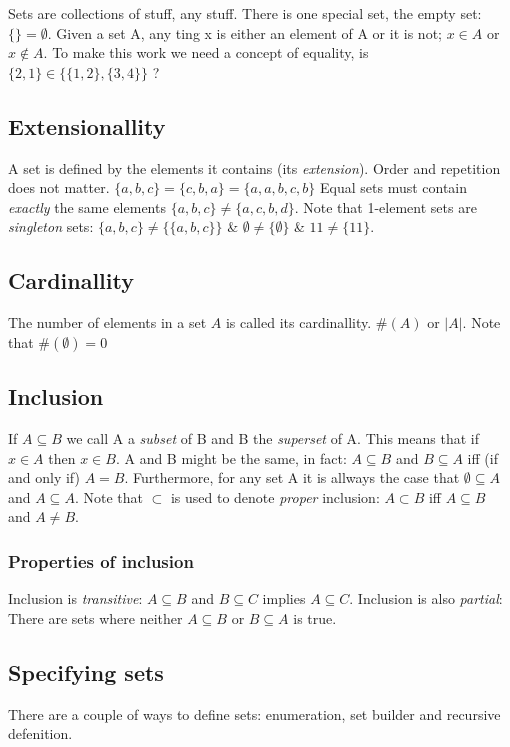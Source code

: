 \documentclass[12pt]{article} %
\begin{document}
Sets are collections of stuff, any stuff. There is one special set, the empty set: $\{\} = \emptyset$. Given a set A, any ting x is either an element of A or it is not; $x \in A$ or $x \notin A$. To make this work we need a concept of equality, is $\{2,1\} \in \{\{1,2\},\{3,4\}\}$ ? 

\subsection{Extensionallity}
A set is defined by the elements it contains (its \textit{extension}). Order and repetition does not matter. $\{a,b,c\} = \{c,b,a\} = \{a,a,b,c,b\}$ Equal sets must contain \textit{exactly} the same elements $\{a,b,c\} \neq \{a,c,b,d\}$. Note that 1-element sets are \textit{singleton} sets: $\{a,b,c\} \neq \{\{a,b,c\}\}$ \& $\emptyset \neq \{\emptyset\}$ \& $11 \neq \{11\}$.

\subsection{Cardinallity}

The number of elements in a set $A$ is called its cardinallity. $\#(A)$ or $|A|$. Note that $\#(\emptyset) = 0$

\subsection{Inclusion}
If $A \subseteq B$ we call A a \textit{subset} of B and B the \textit{superset} of A. This means that if $x \in A$ then $x \in B$. A and B might be the same, in fact: $A \subseteq B$ and $B \subseteq A$ iff (if and only if) $A = B$. Furthermore, for any set A it is allways the case that $\emptyset \subseteq A$ and $A \subseteq A$. Note that $\subset$ is used to denote \textit{proper} inclusion: $A \subset B$ iff $A \subseteq B$ and $A \neq B$.

\subsubsection{Properties of inclusion}
Inclusion is \textit{transitive}: $A \subseteq B$ and $B \subseteq C$ implies $A \subseteq C$. Inclusion is also \textit{partial}: There are sets where neither $A \subseteq B$ or $B \subseteq A$ is true.

\subsection{Specifying sets}
There are a couple of ways to define sets: enumeration, set builder and recursive defenition.
\end{document}
